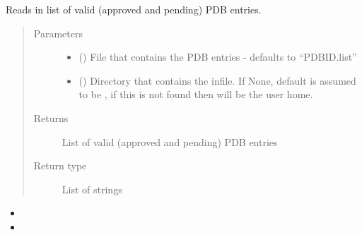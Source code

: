 \documentclass[letterpaper,10pt,english]{sphinxmanual}
\begin{document}
\begin{fulllineitems}
\label{\detokenize{functions:pyresid.load_protein_IDs}}
Reads in list of valid (approved and pending) PDB entries.
\begin{quote}\begin{description}
\item[{Parameters}] \leavevmode\begin{itemize}
\item {} 
 (\sphinxstyleliteralemphasis{\sphinxupquote{, }}\sphinxstyleliteralemphasis{\sphinxupquote{, }}) \textendash{} File that contains the PDB entries - defaults to “PDBID.list”

\item {} 
 (\sphinxstyleliteralemphasis{\sphinxupquote{, }}\sphinxstyleliteralemphasis{\sphinxupquote{, }}) \textendash{} Directory that contains the infile. If None, default is assumed to be , if this
is not found then will be the user home.

\end{itemize}

\item[{Returns}] \leavevmode
{} \textendash{} List of valid (approved and pending) PDB entries

\item[{Return type}] \leavevmode
List of strings

\end{description}\end{quote}



\begin{itemize}
\item {} 

\item {} 

\end{itemize}



\end{fulllineitems}
\end{document}
